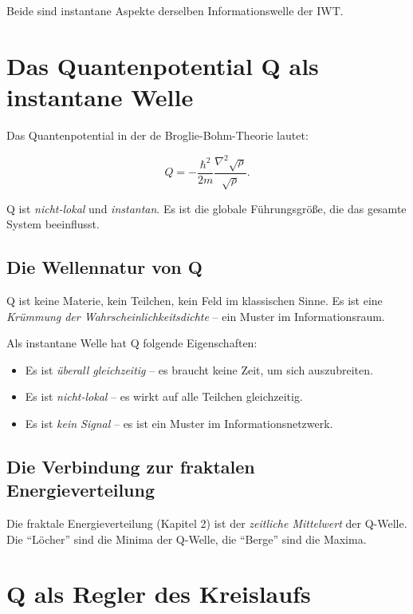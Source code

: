 Beide sind instantane Aspekte derselben Informationswelle der IWT.

\section{Das Quantenpotential Q als instantane Welle}

Das Quantenpotential in der de Broglie-Bohm-Theorie lautet:

\begin{equation}
Q = -\frac{\hbar^2}{2m} \frac{\nabla^2 \sqrt{\rho}}{\sqrt{\rho}}. \tag{5.5}
\end{equation}

Q ist \emph{nicht-lokal} und \emph{instantan}. Es ist die globale Führungsgröße, die das gesamte System beeinflusst.

\subsection{Die Wellennatur von Q}

Q ist keine Materie, kein Teilchen, kein Feld im klassischen Sinne. Es ist eine \emph{Krümmung der Wahrscheinlichkeitsdichte} – ein Muster im Informationsraum. 

Als instantane Welle hat Q folgende Eigenschaften:

\begin{itemize}
    \item Es ist \emph{überall gleichzeitig} – es braucht keine Zeit, um sich auszubreiten.
    \item Es ist \emph{nicht-lokal} – es wirkt auf alle Teilchen gleichzeitig.
    \item Es ist \emph{kein Signal} – es ist ein Muster im Informationsnetzwerk.
\end{itemize}

\subsection{Die Verbindung zur fraktalen Energieverteilung}

Die fraktale Energieverteilung (Kapitel 2) ist der \emph{zeitliche Mittelwert} der Q-Welle. Die \enquote{Löcher} sind die Minima der Q-Welle, die \enquote{Berge}
sind die Maxima.

\section{Q als Regler des Kreislaufs}

